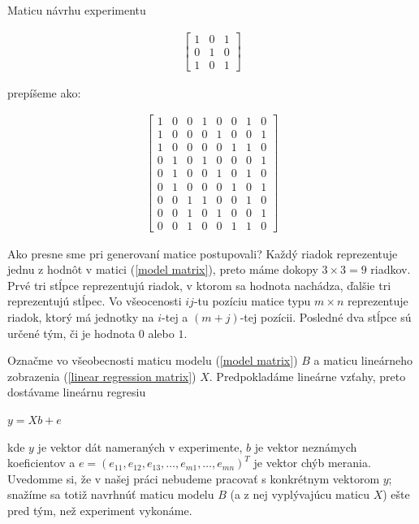 Maticu návrhu experimentu

\begin{align}
\label{model matrix}
\begin{bmatrix}
1 & 0 & 1 \\
0 & 1 & 0 \\
1 & 0 & 1
\end{bmatrix}
\end{align}

prepíšeme ako:

\begin{align}
\label{linear regression matrix}
\begin{bmatrix}
1 & 0 & 0 & 1 & 0 & 0 & 1 & 0 \\
1 & 0 & 0 & 0 & 1 & 0 & 0 & 1 \\
1 & 0 & 0 & 0 & 0 & 1 & 1 & 0 \\
0 & 1 & 0 & 1 & 0 & 0 & 0 & 1 \\
0 & 1 & 0 & 0 & 1 & 0 & 1 & 0 \\
0 & 1 & 0 & 0 & 0 & 1 & 0 & 1 \\
0 & 0 & 1 & 1 & 0 & 0 & 1 & 0 \\
0 & 0 & 1 & 0 & 1 & 0 & 0 & 1 \\
0 & 0 & 1 & 0 & 0 & 1 & 1 & 0
\end{bmatrix}
\end{align}

Ako presne sme pri generovaní matice postupovali?
Každý riadok reprezentuje jednu z hodnôt v matici (\ref{model matrix}), preto máme dokopy $3 \times 3 = 9$ riadkov.
Prvé tri stĺpce reprezentujú riadok, v ktorom sa hodnota nachádza, ďalšie tri reprezentujú stĺpec.
Vo všeocenosti $ij$-tu pozíciu matice typu $m \times n$ reprezentuje riadok,
ktorý má jednotky na $i$-tej a $(m + j)$-tej pozícii.
Posledné dva stĺpce sú určené tým, či je hodnota $0$ alebo $1$.

Označme vo všeobecnosti maticu modelu (\ref{model matrix}) $B$ a maticu lineárneho zobrazenia (\ref{linear regression matrix}) $X$. 
Predpokladáme lineárne vzťahy, preto dostávame lineárnu regresiu

\begin{center}
$
y = X b + e
$
\end{center}

kde $y$ je vektor dát nameraných v experimente, $b$ je vektor neznámych koeficientov a 
$e = (e_{11}, e_{12}, e_{13}, \ldots, e_{m1}, \dots, e_{mn})^T$ je vektor chýb merania. 
Uvedomme si, že v našej práci nebudeme pracovať s konkrétnym vektorom $y$; 
snažíme sa totiž navrhnúť maticu modelu $B$ (a z nej vyplývajúcu maticu $X$) ešte pred tým, než experiment vykonáme.

